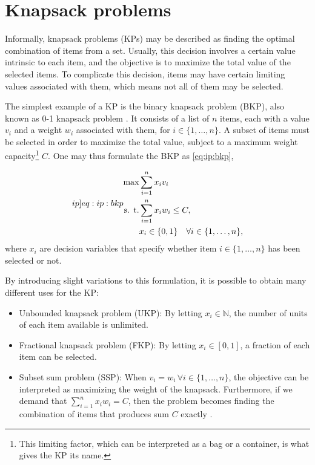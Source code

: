 \section{Knapsack problems}

Informally, knapsack problems (KPs) may be described as finding the optimal combination of items from a set. Usually, this decision involves a certain value intrinsic to each item, and the objective is to maximize the total value of the selected items. To complicate this decision, items may have certain limiting values associated with them, which means not all of them may be selected.

The simplest example of a KP is the binary knapsack problem (BKP), also known as 0-1 knapsack problem \cite{ASSI2018}. It consists of a list of $n$ items, each with a value $v_i$ and a weight $w_i$ associated with them, for $i \in \{1,\dots,n\}$. A subset of items must be selected in order to maximize the total value, subject to a maximum weight capacity\footnote{This limiting factor, which can be interpreted as a bag or a container, is what gives the KP its name.} $C$. One may thus formulate the BKP as \cref{eq:ip:bkp},

\begin{align}
    \label[ip]{eq:ip:bkp}
    \begin{split}
        \max &\sum_{i=1}^{n}x_iv_i\\
        \textrm{s. t.}& \sum_{i=1}^{n}x_iw_i \leq C,\\
        &x_i \in \{0,1\} \quad \forall i \in \{1,\dots,n\},
    \end{split}
\end{align}
where $x_i$ are decision variables that specify whether item $i \in \{1,\dots,n\}$ has been selected or not.

By introducing slight variations to this formulation, it is possible to obtain many different uses for the KP:

\begin{itemize}
    \item Unbounded knapsack problem (UKP): By letting $x_i \in \mathbb{N}$, the number of units of each item available is unlimited.
    \item Fractional knapsack problem (FKP): By letting $x_i \in [0, 1]$, a fraction of each item can be selected.
    \item Subset sum problem (SSP): When $v_i = w_i \, \forall i \in \{1,\dots,n\}$, the objective can be interpreted as maximizing the weight of the knapsack. Furthermore, if we demand that $\sum_{i=1}^{n}x_iw_i = C$, then the problem becomes finding the combination of items that produces sum $C$ exactly \cite{FEOFILOFF2020b}.
\end{itemize}

